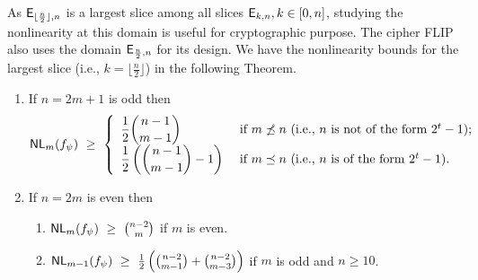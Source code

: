 \documentclass{llncs}
\begin{document}
As $\mathsf{E}_{\lfloor\frac{n}{2}\rfloor,n}$ is a largest slice among all slices $\mathsf{E}_{k,n}, k \in [0,n]$, studying the nonlinearity at this domain is useful for cryptographic purpose. The cipher FLIP also uses the domain $\mathsf{E}_{\frac{n}{2},n}$ for its design. We have the nonlinearity bounds for the largest slice (i.e., $k = \lfloor\frac{n}{2}\rfloor$) in the following Theorem.
\begin{theorem}\label{thm:NLk_boundm}
\begin{enumerate}
\item If $n = 2m+1$ is odd then
$$\mathsf{NL}_{m}(f_\psi) ~\geq ~ 
\left\{ \begin{array}{ll}
\displaystyle{\frac{1}{2}{n-1 \choose m-1}}  & \text{ if }  m \not\preceq n ~(\text{i.e., } n \text{ is not of the form } 2^t-1); \\
\displaystyle{\frac{1}{2}\left({n-1 \choose m-1} - 1\right)} & \text{ if } m \preceq n ~(\text{i.e., } n \text{ is of the form } 2^t-1).
\end{array}  \right.$$
\item If $n = 2m$ is even then 
\begin{enumerate}
 \item $\mathsf{NL}_{m}(f_\psi) ~\geq ~ {n-2 \choose m}$ if $m$ is even.
 \item $\mathsf{NL}_{m-1}(f_\psi) ~\geq ~ \frac{1}{2}\left({n-2 \choose m-1} + {n-2 \choose m-3}\right)$ if $m$ is odd and $n \geq 10$.
\end{enumerate}
\end{enumerate}
\end{theorem}
\end{document}
